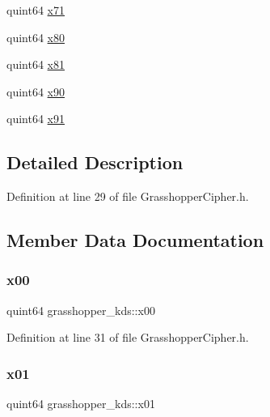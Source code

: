 \begin{DoxyCompactItemize}
\item 
quint64 \hyperlink{structgrasshopper__kds_a78cd3b18320cdfe5c08c2dc38d59f2bd}{x71}
\item 
quint64 \hyperlink{structgrasshopper__kds_a85e2b6a55ddcde2fbeec73c890d1499b}{x80}
\item 
quint64 \hyperlink{structgrasshopper__kds_a1aad104bd24ba823f09d22f7ea7a0bcb}{x81}
\item 
quint64 \hyperlink{structgrasshopper__kds_aa4c9c8d0b67a4e8ddceaa210ce6c3f9b}{x90}
\item 
quint64 \hyperlink{structgrasshopper__kds_a0dfb862b74ed75fdc943f37751954522}{x91}
\end{DoxyCompactItemize}


\subsection{Detailed Description}


Definition at line 29 of file Grasshopper\+Cipher.\+h.



\subsection{Member Data Documentation}
\mbox{\label{structgrasshopper__kds_a324b5f8ea0724dd1cc1216b62ef65057}} 
\subsubsection{\texorpdfstring{x00}{x00}}
{\footnotesize\ttfamily quint64 grasshopper\+\_\+kds\+::x00}



Definition at line 31 of file Grasshopper\+Cipher.\+h.

\mbox{\label{structgrasshopper__kds_a81c96865b2970acc72c5e829bbdb29ce}} 
\subsubsection{\texorpdfstring{x01}{x01}}
{\footnotesize\ttfamily quint64 grasshopper\+\_\+kds\+::x01}



